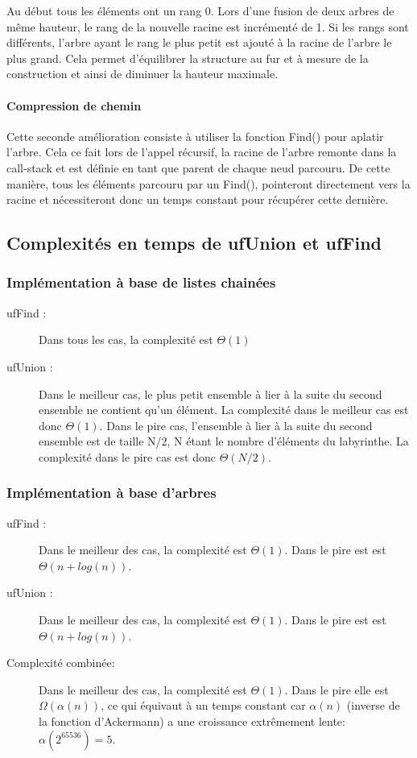 \documentclass[10pt]{article}
\begin{document}
	Au début tous les éléments ont un rang 0. Lors d'une fusion de deux arbres de même hauteur, le rang de la nouvelle racine est incrémenté de 1. Si les rangs sont différents, l'arbre ayant le rang le plus petit est ajouté à la racine de l'arbre le plus grand. Cela permet d'équilibrer la structure au fur et à mesure de la construction et ainsi de diminuer la hauteur maximale.
	
	\paragraph{Compression de chemin}
	Cette seconde amélioration consiste à utiliser la fonction Find() pour aplatir l'arbre. Cela ce fait lors de l'appel récursif, la racine de l'arbre remonte dans la call-stack et est définie en tant que parent de chaque neud parcouru. De cette manière, tous les éléments parcouru par un Find(), pointeront directement vers la racine et nécessiteront donc un temps constant pour récupérer cette dernière.

\subsection{Complexités en temps de ufUnion et ufFind}

\subsubsection{Implémentation à base de listes chainées}

\begin{description}
\item[ufFind :] Dans tous les cas, la complexité est $\Theta(1)$
\item[ufUnion :] Dans le meilleur cas, le plus petit ensemble à lier à la suite du second ensemble ne contient qu'un élément. La complexité dans le meilleur cas est donc $\Theta(1)$. Dans le pire cas, l'ensemble à lier à la suite du second ensemble est de taille N/2, N étant le nombre d'éléments du labyrinthe. La complexité dans le pire cas est donc $\Theta(N/2)$.
\end{description}
\subsubsection{Implémentation à base d'arbres}
\begin{description}
\item[ufFind :] Dans le meilleur des cas, la complexité est $\Theta(1)$. Dans le pire est est $\Theta(n + log(n))$. 
\item[ufUnion :] Dans le meilleur des cas, la complexité est $\Theta(1)$. Dans le pire est est $\Theta(n + log(n))$.
\item[Complexité combinée:] Dans le meilleur des cas, la complexité est $\Theta(1)$. Dans le pire elle est $\Omega( \alpha(n))$, ce qui équivaut à un temps constant car $\alpha(n)$ (inverse de la fonction d'Ackermann) a une croissance extrêmement lente: $\alpha(2^{65536}) = 5$.
\end{description}
\end{document}
